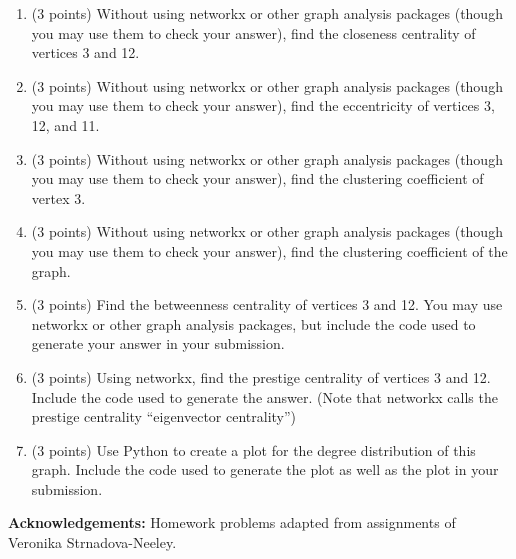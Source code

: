\documentclass[11pt]{article}
\begin{document}
\begin{enumerate}

    \item (3 points) Without using networkx or other graph analysis packages
    (though you may use them to check your answer), find the closeness
    centrality of vertices 3 and 12.

    \item (3 points) Without using networkx or other graph analysis packages
    (though you may use them to check your answer), find the eccentricity of
    vertices 3, 12, and 11.

    \item (3 points) Without using networkx or other graph analysis packages
    (though you may use them to check your answer), find the clustering
    coefficient of vertex 3.

    \item (3 points) Without using networkx or other graph analysis packages
    (though you may use them to check your answer), find the clustering
    coefficient of the graph.

    \item (3 points) Find the betweenness centrality of vertices 3 and 12. You
    may use networkx or other graph analysis packages, but include the code used
    to generate your answer in your submission.

    \item (3 points) Using networkx, find the prestige centrality of vertices 3
    and 12. Include the code used to generate the answer. (Note that networkx
    calls the prestige centrality ``eigenvector centrality'')

    \item (3 points) Use Python to create a plot for the degree distribution of
    this graph.  Include the code used to generate the plot as well as the plot
    in your submission.

\end{enumerate}

{\bf Acknowledgements:} Homework problems adapted from assignments of
Veronika Strnadova-Neeley.
\end{document}
